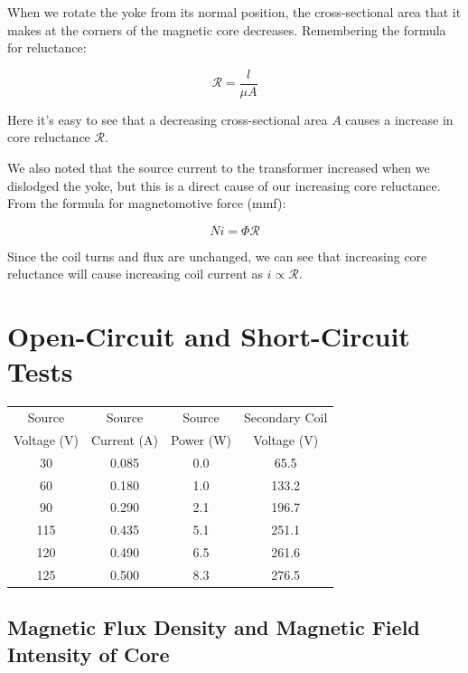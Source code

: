 \documentclass{IEEEtran}
\begin{document}
When we rotate the yoke from its normal position, the cross-sectional area that it makes at the corners of the magnetic core decreases. Remembering the formula for reluctance:

\begin{equation}
    \mathcal{R} = \frac{l}{\mu A}
    \label{eq:reluctance}
\end{equation}

Here it's easy to see that a decreasing cross-sectional area \(A\) causes a increase in core reluctance \(\mathcal{R}\).

We also noted that the source current to the transformer increased when we dislodged the yoke, but this is a direct cause of our increasing core reluctance. From the formula for magnetomotive force (mmf):

\begin{equation}
    Ni = \Phi \mathcal{R}
    \label{eq:mmf}
\end{equation}

Since the coil turns and flux are unchanged, we can see that increasing core reluctance will cause increasing coil current as \(i \propto \mathcal{R}\).

\section{Open-Circuit and Short-Circuit Tests}

\smallskip
\begin{center}
\begin{tabular}{ |c|c|c|c| }
    \hline
    Source & Source & Source & Secondary Coil \\
    Voltage (V) & Current (A) & Power (W) & Voltage (V) \\
    \hline
    30 & 0.085 & 0.0 & 65.5 \\
    \hline
    60 & 0.180 & 1.0 & 133.2 \\
    \hline
    90 & 0.290 & 2.1 & 196.7 \\
    \hline
    115 & 0.435 & 5.1 & 251.1 \\
    \hline
    120 & 0.490 & 6.5 & 261.6 \\
    \hline
    125 & 0.500 & 8.3 & 276.5 \\
    \hline
\end{tabular}
\end{center}

\subsection{Magnetic Flux Density and Magnetic Field Intensity of Core}
\end{document}
